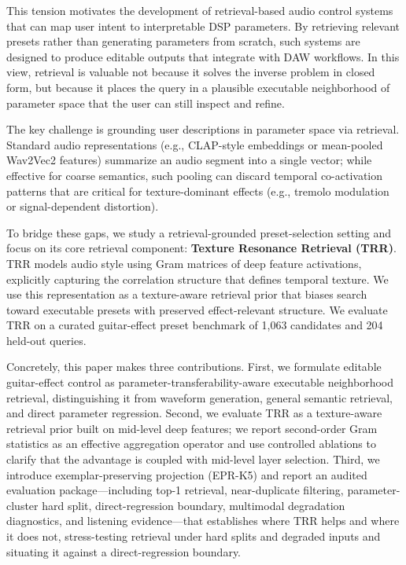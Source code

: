 This tension motivates the development of retrieval-based audio control systems that can map user intent to interpretable DSP parameters. By retrieving relevant presets rather than generating parameters from scratch, such systems are designed to produce editable outputs that integrate with DAW workflows. In this view, retrieval is valuable not because it solves the inverse problem in closed form, but because it places the query in a plausible executable neighborhood of parameter space that the user can still inspect and refine.

The key challenge is grounding user descriptions in parameter space via retrieval. Standard audio representations (e.g., CLAP-style embeddings or mean-pooled Wav2Vec2 features) summarize an audio segment into a single vector; while effective for coarse semantics, such pooling can discard temporal co-activation patterns that are critical for texture-dominant effects (e.g., tremolo modulation or signal-dependent distortion).

To bridge these gaps, we study a retrieval-grounded preset-selection setting and focus on its core retrieval component: \textbf{Texture Resonance Retrieval (TRR)}. TRR models audio style using Gram matrices of deep feature activations, explicitly capturing the correlation structure that defines temporal texture. We use this representation as a texture-aware retrieval prior that biases search toward executable presets with preserved effect-relevant structure. We evaluate TRR on a curated guitar-effect preset benchmark of 1,063 candidates and 204 held-out queries.

Concretely, this paper makes three contributions. First, we formulate editable guitar-effect control as parameter-transferability-aware executable neighborhood retrieval, distinguishing it from waveform generation, general semantic retrieval, and direct parameter regression. Second, we evaluate TRR as a texture-aware retrieval prior built on mid-level deep features; we report second-order Gram statistics as an effective aggregation operator and use controlled ablations to clarify that the advantage is coupled with mid-level layer selection. Third, we introduce exemplar-preserving projection (EPR-K5) and report an audited evaluation package---including top-1 retrieval, near-duplicate filtering, parameter-cluster hard split, direct-regression boundary, multimodal degradation diagnostics, and listening evidence---that establishes where TRR helps and where it does not, stress-testing retrieval under hard splits and degraded inputs and situating it against a direct-regression boundary.

